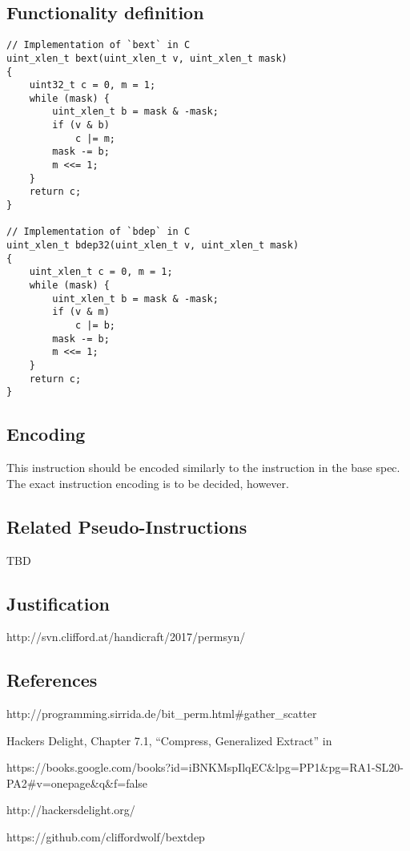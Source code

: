 \subsection{Functionality definition}

\begin{verbatim}
// Implementation of `bext` in C
uint_xlen_t bext(uint_xlen_t v, uint_xlen_t mask)
{
    uint32_t c = 0, m = 1;
    while (mask) {
        uint_xlen_t b = mask & -mask;
        if (v & b)
            c |= m;
        mask -= b;
        m <<= 1;
    }
    return c;
}

// Implementation of `bdep` in C
uint_xlen_t bdep32(uint_xlen_t v, uint_xlen_t mask)
{
    uint_xlen_t c = 0, m = 1;
    while (mask) {
        uint_xlen_t b = mask & -mask;
        if (v & m)
            c |= b;
        mask -= b;
        m <<= 1;
    }
    return c;
}
\end{verbatim}

\subsection{Encoding}



This instruction should be encoded similarly to the instruction in the
base spec. The exact instruction encoding is to be decided, however.

\subsection{Related Pseudo-Instructions}

TBD

\subsection{Justification}

http://svn.clifford.at/handicraft/2017/permsyn/

\subsection{References}

http://programming.sirrida.de/bit\_perm.html\#gather\_scatter

Hackers Delight, Chapter 7.1, ``Compress, Generalized Extract'' in

https://books.google.com/books?id=iBNKMspIlqEC\&lpg=PP1\&pg=RA1-SL20-PA2\#v=onepage\&q\&f=false

http://hackersdelight.org/

https://github.com/cliffordwolf/bextdep
